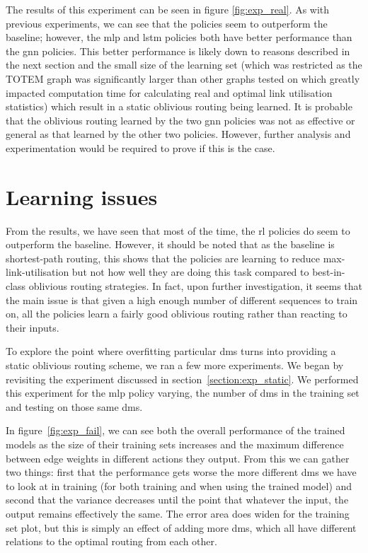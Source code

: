 The results of this experiment can be seen in figure \ref{fig:exp_real}. As with previous experiments, we can see that the policies seem to outperform the baseline; however, the \ac{mlp} and \ac{lstm} policies both have better performance than the \ac{gnn} policies. This better performance is likely down to reasons described in the next section and the small size of the learning set (which was restricted as the TOTEM graph was significantly larger than other graphs tested on which greatly impacted computation time for calculating real and optimal link utilisation statistics) which result in a static oblivious routing being learned. It is probable that the oblivious routing learned by the two \ac{gnn} policies was not as effective or general as that learned by the other two policies. However, further analysis and experimentation would be required to prove if this is the case.


\section{Learning issues}
\label{section:overfit}
From the results, we have seen that most of the time, the \ac{rl} policies do seem to outperform the baseline. However, it should be noted that as the baseline is shortest-path routing, this shows that the policies are learning to reduce max-link-utilisation but not how well they are doing this task compared to best-in-class oblivious routing strategies. In fact, upon further investigation, it seems that the main issue is that given a high enough number of different sequences to train on, all the policies learn a fairly good oblivious routing rather than reacting to their inputs.

To explore the point where overfitting particular \acp{dm} turns into providing a static oblivious routing scheme, we ran a few more experiments. We began by revisiting the experiment discussed in section~\ref{section:exp_static}. We performed this experiment for the \ac{mlp} policy varying, the number of \acp{dm} in the training set and testing on those same \acp{dm}.

In figure~\ref{fig:exp_fail}, we can see both the overall performance of the trained models as the size of their training sets increases and the maximum difference between edge weights in different actions they output. From this we can gather two things: first that the performance gets worse the more different \acp{dm} we have to look at in training (for both training and when using the trained model) and second that the variance decreases until the point that whatever the input, the output remains effectively the same. The error area does widen for the training set plot, but this is simply an effect of adding more \acp{dm}, which all have different relations to the optimal routing from each other.


